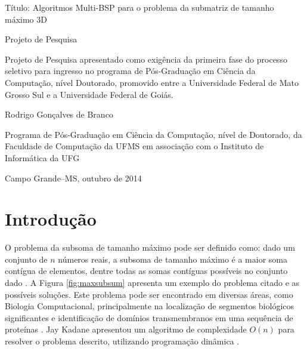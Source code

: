 \documentclass[a4paper, 12pt] {article}
\begin{document}
\thispagestyle{empty}
\begin{center}

\vskip 2.2cm

\Large{Título: Algoritmos Multi-BSP para o problema da submatriz de tamanho
máximo 3D}

\vskip 1.5cm

\Large{Projeto de Pesquisa}

\vskip 1.5cm

\Large{Projeto de Pesquisa apresentado como exigência da primeira fase do
processo seletivo para ingresso no programa de Pós-Graduação em Ciência
da Computação, nível Doutorado, promovido entre a Universidade
Federal de Mato Grosso Sul e a Universidade Federal de Goiás.}

\vskip 2.5cm

\Large{Rodrigo Gonçalves de Branco}

\vskip 2.0cm


\vskip 2.5cm

\large{Programa de Pós-Graduação em Ciência da Computação, nível de Doutorado,
da Faculdade de Computação da UFMS em associação com o Instituto de Informática da UFG}

\vskip 1.3cm

Campo Grande--MS, outubro de 2014

\end{center}

\clearpage
\onehalfspacing

\section{Introdução}

O problema da subsoma de tamanho máximo pode ser definido como: dado um conjunto
de $n$ números reais, a subsoma de tamanho máximo é a maior soma contígua de
elementos, dentre todas as somas contíguas possíveis no conjunto
dado \cite{bentley2000programming}. A Figura \ref{fig:maxsubsum} apresenta um
exemplo do problema citado e as possíveis soluções.
Este problema pode ser encontrado em diversas áreas, como Biologia Computacional, principalmente na localização de segmentos biológicos significantes e identificação de domínios
transmembranos em uma sequência de proteínas \cite{bae2007}. Jay Kadane
apresentou um algoritmo de complexidade $O(n)$ para resolver o problema descrito, utilizando 
programação dinâmica \cite{bentley2000programming}.
\end{document}
